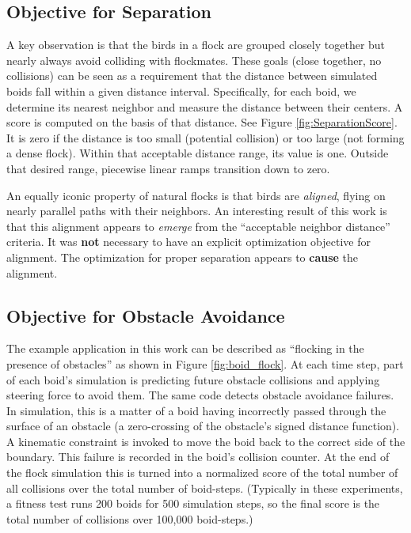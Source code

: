 \documentclass[letterpaper]{article}
\begin{document}
\subsection{Objective for Separation}
\label{subsec:separation_objective}

A key observation is that the birds in a flock are grouped closely together but nearly always avoid colliding with flockmates. These goals (close together, no collisions) can be seen as a requirement that the distance between simulated boids fall within a given distance interval. Specifically, for each boid, we determine its nearest neighbor and measure the distance between their centers. A score is computed on the basis of that distance. See Figure \ref{fig:SeparationScore}. It is zero if the distance is too small (potential collision) or too large (not forming a dense flock). Within that acceptable distance range, its value is one. Outside that desired range, piecewise linear ramps transition down to zero.

An equally iconic property of natural flocks is that birds are \textit{aligned}, flying on nearly parallel paths with their neighbors. An interesting result of this work is that this alignment appears to \textit{emerge} from the ``acceptable neighbor distance'' criteria. It was \textbf{not} necessary to have an explicit optimization objective for alignment. The optimization for proper separation appears to \textbf{cause} the alignment.

\subsection{Objective for Obstacle Avoidance}
\label{subsec:avoidance_objective}

The example application in this work can be described as ``flocking in the presence of obstacles'' as shown in Figure \ref{fig:boid_flock}. At each time step, part of each boid's simulation is predicting future obstacle collisions and applying steering force to avoid them. The same code detects obstacle avoidance failures. In simulation, this is a matter of a boid having incorrectly passed through the surface of an obstacle (a zero-crossing of the obstacle's signed distance function). A kinematic constraint is invoked to move the boid back to the correct side of the boundary. This failure is recorded in the boid's collision counter. At the end of the flock simulation this is turned into a normalized score of the total number of all collisions over the total number of boid-steps. (Typically in these experiments, a fitness test runs 200 boids for 500 simulation steps, so the final score is the total number of collisions over 100,000 boid-steps.) 
\end{document}
